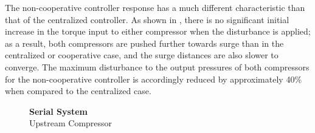 The non-cooperative controller response has a much different characteristic than that of the centralized controller.
As shown in , there is no significant initial increase in the torque input to either compressor when the disturbance is applied; as a result, both compressors are pushed further towards surge than in the centralized or cooperative case, and the surge distances are also slower to converge.
The maximum disturbance to the output pressures of both compressors for the non-cooperative controller is accordingly reduced by approximately 40\% when compared to the centralized case.

\ifmakeplots
\begin{figure}
  {\centering\large\textbf{Serial System}\\ Upstream Compressor\\[1em]}
  \begin{subfigure}{0.48\linewidth}
    \footnotesize
    
    \normalsize
    \caption{}
    \label{fig:res:serial-timeresp:p1}
  \end{subfigure}
  \hfill
  \begin{subfigure}{0.48\linewidth}
    \footnotesize
    
    \normalsize
    \caption{}
    \label{fig:res:serial-timeresp:sd1}
  \end{subfigure}
  \\
  \begin{subfigure}{0.48\linewidth}
    \footnotesize
    
    \normalsize
    \caption{}
    \label{fig:res:serial-timeresp:td1}
  \end{subfigure}
  \hfill
  \begin{subfigure}{0.48\linewidth}
    \footnotesize
    
    \normalsize
    \caption{}
    \label{fig:res:serial-timeresp:ur1}
  \end{subfigure}
\end{figure}

